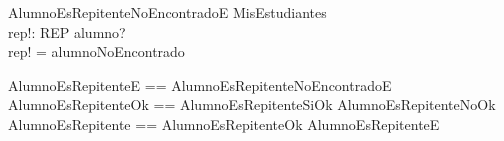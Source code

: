\begin{schema}{AlumnoEsRepitenteNoEncontradoE}
    \Xi MisEstudiantes \\
    rep!: REP
    \where
    alumno? \notin {} \\
    rep! = alumnoNoEncontrado
\end{schema}

\begin{zed}
    AlumnoEsRepitenteE == AlumnoEsRepitenteNoEncontradoE \\
    AlumnoEsRepitenteOk == AlumnoEsRepitenteSiOk \lor AlumnoEsRepitenteNoOk \\
    AlumnoEsRepitente == AlumnoEsRepitenteOk \lor AlumnoEsRepitenteE \\
\end{zed}
